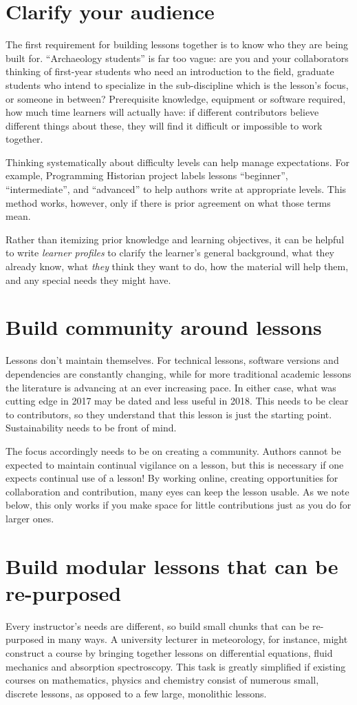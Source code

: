 \documentclass[10pt,letterpaper]{article}
\newcommand{\rulemajor}[1]{\section{#1}}
\begin{document}
\rulemajor{Clarify your audience}

The first requirement for building lessons together is
to know who they are being built for.
``Archaeology students'' is far too vague:
are you and your collaborators thinking of
first-year students who need an introduction to the field,
graduate students who intend to specialize in the sub-discipline which is the lesson's focus,
or someone in between?
Prerequisite knowledge,
equipment or software required,
how much time learners will actually have:
if different contributors believe different things about these,
they will find it difficult or impossible to work together.

Thinking systematically about difficulty levels can help manage expectations.
For example,
Programming Historian project labels lessons ``beginner'',
``intermediate'',
and ``advanced''
to help authors write at appropriate levels.
This method works, however, only if there is prior agreement on what those terms mean.

Rather than itemizing prior knowledge and learning objectives,
it can be helpful to write \emph{learner profiles} to clarify
the learner's general background,
what they already know,
what \emph{they} think they want to do,
how the material will help them,
and any special needs they might have.

\rulemajor{Build community around lessons}

Lessons don't maintain themselves.
For technical lessons, software versions and dependencies are constantly changing,
while for more traditional academic lessons the literature is advancing at an ever increasing pace.
In either case, what was cutting edge in 2017 may be dated
and less useful in 2018.
This needs to be clear to contributors,
so they understand that this lesson is just
the starting point.
Sustainability needs to be front of mind.

The focus accordingly needs to be on creating a community.
Authors cannot be expected to maintain continual vigilance on a lesson,
but this is necessary if one expects continual use of a lesson!
By working online, creating opportunities for collaboration
and contribution, many eyes can keep the lesson usable.
As we note below,
this only works if you make space for
little contributions just as you do for larger ones.

\rulemajor{Build modular lessons that can be re-purposed}

Every instructor's needs are different,
so build small chunks that can be re-purposed in many ways.
A university lecturer in meteorology, for instance,
might construct a course by bringing together lessons on differential equations,
fluid mechanics and absorption spectroscopy.
This task is greatly simplified if existing courses on mathematics,
physics and chemistry consist of numerous small, discrete lessons,
as opposed to a few large, monolithic lessons.
\end{document}
